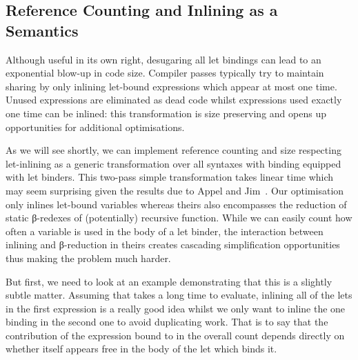 \subsection{Reference Counting and Inlining as a Semantics}\label{section:inlining}

Although useful in its own right, desugaring all let bindings can lead
to an exponential blow-up in code size. Compiler passes typically try
to maintain sharing by only inlining let-bound expressions which appear
at most one time. Unused expressions are eliminated as dead code whilst
expressions used exactly one time can be inlined: this transformation is
size preserving and opens up opportunities for additional optimisations.

As we will see shortly, we can implement reference counting and size
respecting let-inlining as a generic transformation over all syntaxes
with binding equipped with let binders. This two-pass simple transformation
takes linear time which may seem surprising given the results due to Appel and
Jim~\citeyear{DBLP:journals/jfp/AppelJ97}. Our optimisation only inlines
let-bound variables whereas theirs also encompasses the reduction of static
β-redexes of (potentially) recursive function. While we can easily count how
often a variable is used in the body of a let binder, the interaction between
inlining and β-reduction in theirs creates cascading simplification opportunities
thus making the problem much harder.

But first, we need to look at an example demonstrating that this is a
slightly subtle matter. Assuming that  takes a long time
to evaluate, inlining all of the lets in the first expression is a really
good idea whilst we only want to inline the one binding  in the
second one to avoid duplicating work. That is to say that the contribution
of the expression bound to  in the overall count depends directly
on whether  itself appears free in the body of the let which binds it.

\begin{figure}[h]
\begin{minipage}{0.45\textwidth}
\end{minipage}
\begin{minipage}{0.45\textwidth}
\end{minipage}
\end{figure}


